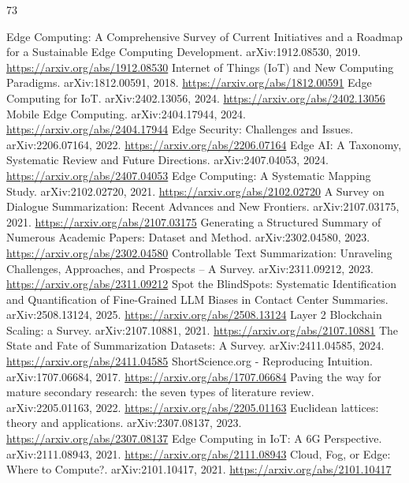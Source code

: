 \documentclass[11pt]{article}
\begin{document}
\begin{thebibliography}{73}
 Edge Computing: A Comprehensive Survey of Current Initiatives and a Roadmap for a Sustainable Edge Computing Development. arXiv:1912.08530, 2019. \url{https://arxiv.org/abs/1912.08530}
 Internet of Things (IoT) and New Computing Paradigms. arXiv:1812.00591, 2018. \url{https://arxiv.org/abs/1812.00591}
 Edge Computing for IoT. arXiv:2402.13056, 2024. \url{https://arxiv.org/abs/2402.13056}
 Mobile Edge Computing. arXiv:2404.17944, 2024. \url{https://arxiv.org/abs/2404.17944}
 Edge Security: Challenges and Issues. arXiv:2206.07164, 2022. \url{https://arxiv.org/abs/2206.07164}
 Edge AI: A Taxonomy, Systematic Review and Future Directions. arXiv:2407.04053, 2024. \url{https://arxiv.org/abs/2407.04053}
 Edge Computing: A Systematic Mapping Study. arXiv:2102.02720, 2021. \url{https://arxiv.org/abs/2102.02720}
 A Survey on Dialogue Summarization: Recent Advances and New Frontiers. arXiv:2107.03175, 2021. \url{https://arxiv.org/abs/2107.03175}
 Generating a Structured Summary of Numerous Academic Papers: Dataset and Method. arXiv:2302.04580, 2023. \url{https://arxiv.org/abs/2302.04580}
 Controllable Text Summarization: Unraveling Challenges, Approaches, and Prospects -- A Survey. arXiv:2311.09212, 2023. \url{https://arxiv.org/abs/2311.09212}
 Spot the BlindSpots: Systematic Identification and Quantification of Fine-Grained LLM Biases in Contact Center Summaries. arXiv:2508.13124, 2025. \url{https://arxiv.org/abs/2508.13124}
 Layer 2 Blockchain Scaling: a Survey. arXiv:2107.10881, 2021. \url{https://arxiv.org/abs/2107.10881}
 The State and Fate of Summarization Datasets: A Survey. arXiv:2411.04585, 2024. \url{https://arxiv.org/abs/2411.04585}
 ShortScience.org - Reproducing Intuition. arXiv:1707.06684, 2017. \url{https://arxiv.org/abs/1707.06684}
 Paving the way for mature secondary research: the seven types of literature review. arXiv:2205.01163, 2022. \url{https://arxiv.org/abs/2205.01163}
 Euclidean lattices: theory and applications. arXiv:2307.08137, 2023. \url{https://arxiv.org/abs/2307.08137}
 Edge Computing in IoT: A 6G Perspective. arXiv:2111.08943, 2021. \url{https://arxiv.org/abs/2111.08943}
 Cloud, Fog, or Edge: Where to Compute?. arXiv:2101.10417, 2021. \url{https://arxiv.org/abs/2101.10417}

\end{thebibliography}
\end{document}
